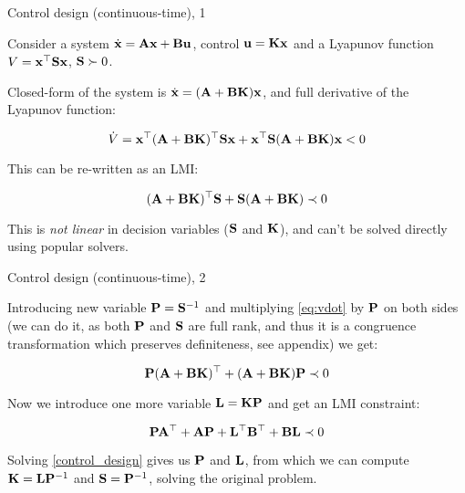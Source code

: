 \documentclass{beamer}
\begin{document}
\begin{frame}{Control design (continuous-time), 1}
	\begin{flushleft}
		
		Consider a system $\dot{\mathbf{x}} = \mathbf{A}\mathbf{x} + \mathbf{B}\mathbf{u}$, control $\mathbf{u} = \mathbf{K}\mathbf{x}$ and a Lyapunov function $V = \mathbf{x}^\top\mathbf{S}\mathbf{x}$, $\mathbf{S} \succ 0$.
		
		\bigskip
		
		Closed-form of the system is $\dot{\mathbf{x}} = (\mathbf{A} + \mathbf{B}\mathbf{K})\mathbf{x}$, and full derivative of the Lyapunov function:
		
		\begin{equation}
			\dot V = \mathbf{x}^\top (\mathbf{A} + \mathbf{B}\mathbf{K})^\top\mathbf{S}\mathbf{x} + \mathbf{x}^\top\mathbf{S} (\mathbf{A} + \mathbf{B}\mathbf{K}) \mathbf{x} < 0
		\end{equation}
		
		This can be re-written as an LMI:
		
		\begin{equation}
			\label{eq:vdot}
			(\mathbf{A} + \mathbf{B}\mathbf{K})^\top\mathbf{S} + \mathbf{S} (\mathbf{A} + \mathbf{B}\mathbf{K}) \prec 0
		\end{equation}
		
		This is \emph{not linear} in decision variables ($\mathbf{S}$ and $\mathbf{K}$), and can't be solved directly using popular solvers.
		
	\end{flushleft}
\end{frame}




\begin{frame}{Control design (continuous-time), 2}
	\begin{flushleft}
		
		Introducing new variable $\mathbf{P} = \mathbf{S}^{-1}$ and multiplying \eqref{eq:vdot} by $\mathbf{P}$ on both sides (we can do it, as both $\mathbf{P}$ and $\mathbf{S}$ are full rank, and thus it is a congruence transformation which preserves definiteness, see appendix) we get:
		
		\begin{equation}
			\mathbf{P}(\mathbf{A} + \mathbf{B}\mathbf{K})^\top + (\mathbf{A} + \mathbf{B}\mathbf{K})\mathbf{P} \prec 0
		\end{equation}
		
		Now we introduce one more variable $\mathbf{L} = \mathbf{K}\mathbf{P}$ and get an LMI constraint:
		
		\begin{equation}
			\label{control_design}
			\mathbf{P}\mathbf{A}^\top + \mathbf{A}\mathbf{P} + \mathbf{L}^\top\mathbf{B}^\top + \mathbf{B}\mathbf{L} \prec 0
		\end{equation}
		
		Solving \eqref{control_design} gives us $\mathbf{P}$ and $\mathbf{L}$, from which we can compute $\mathbf{K} = \mathbf{L}\mathbf{P}^{-1}$ and $\mathbf{S} = \mathbf{P}^{-1}$, solving the original problem.
		
	\end{flushleft}
\end{frame}
\end{document}
